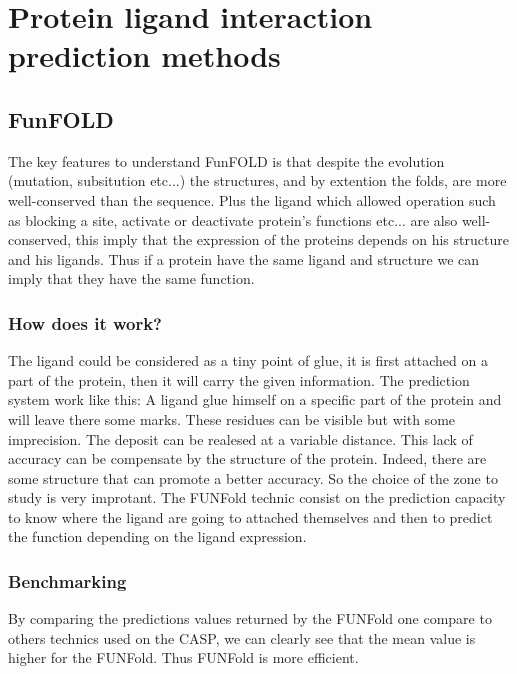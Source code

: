 \section{Protein ligand interaction prediction methods}
\subsection{FunFOLD}
The key features to understand FunFOLD is that despite the evolution (mutation, subsitution etc...) the structures, and by extention the folds, are more well-conserved than the sequence. Plus the ligand which allowed operation such as blocking a site, activate or deactivate protein's functions etc... are also well-conserved, this imply that the expression of the proteins depends on his structure and his ligands. Thus if a protein have the same ligand and structure we can imply that they have the same function.
\newline
\subsubsection{How does it work?}
The ligand could be considered as a tiny point of glue, it is first attached on a part of the protein, then it will carry the given information.
\newline
The prediction system work like this:
\newline
A ligand glue himself on a specific part of the protein and will leave there some marks. These residues can be visible but with some imprecision. The deposit can be realesed at a variable distance. This lack of accuracy can be compensate by the structure of the protein. Indeed, there are some structure that can promote a better accuracy. So the choice of the zone to study is very improtant. 
\newline
The FUNFold technic consist on the prediction capacity to know where the ligand are going to attached themselves and then to predict the function depending on the ligand expression.
\subsubsection{Benchmarking}
By comparing the predictions values returned by the FUNFold one compare to others technics used on the CASP, we can clearly see that the mean value is higher for the FUNFold. Thus FUNFold is more efficient.
